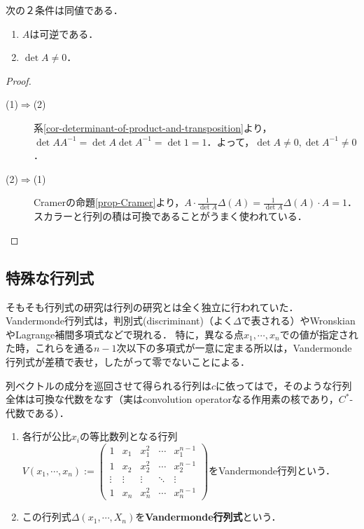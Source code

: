 \documentclass[uplatex, dvipdfmx]{jsreport}
\begin{document}
\begin{corollary}\label{cor-characterization-of-invertibility}
    次の２条件は同値である．
    \begin{enumerate}
        \item $A$は可逆である．
        \item $\det A\ne 0$．
    \end{enumerate}
\end{corollary}
\begin{proof}\mbox{}
    \begin{description}
        \item[(1)$\Rightarrow$(2)] 系\ref{cor-determinant-of-product-and-transposition}より，$\det AA^{-1}=\det A\det A^{-1}=\det 1=1$．よって，$\det A\ne 0,\det A^{-1}\ne 0$．
        \item[(2)$\Rightarrow$(1)] Cramerの命題\ref{prop-Cramer}より，$A\cdot\frac{1}{\det A}\Delta(A)=\frac{1}{\det A}\Delta(A)\cdot A=1$．スカラーと行列の積は可換であることがうまく使われている．
    \end{description}
\end{proof}

\subsection{特殊な行列式}

\begin{tcolorbox}[colframe=ForestGreen, colback=ForestGreen!10!white,breakable,colbacktitle=ForestGreen!40!white,coltitle=black,fonttitle=\bfseries\sffamily,
title=]
    そもそも行列式の研究は行列の研究とは全く独立に行われていた．
    Vandermonde行列式は，判別式(discriminant)（よく$\Delta$で表される）やWronskianやLagrange補間多項式などで現れる．
    特に，異なる点$x_1,\cdots,x_n$での値が指定された時，これらを通る$n-1$次以下の多項式が一意に定まる所以は，Vandermonde行列式が差積で表せ，したがって零でないことによる．
    
    列ベクトルの成分を巡回させて得られる行列は$c$に依ってはで，そのような行列全体は可換な代数をなす（実はconvolution operatorなる作用素の核であり，$C^*$-代数である）．
\end{tcolorbox}

\begin{definition}\mbox{}
    \begin{enumerate}
        \item 各行が公比$x_i$の等比数列となる行列$V(x_1,\cdots,x_n):=\begin{pmatrix}1&x_1&x_1^2&\cdots&x_1^{n-1}\\1&x_2&x_2^2&\cdots&x_2^{n-1}\\\vdots&\vdots&\vdots&\ddots&\vdots\\1&x_n&x_n^2&\cdots&x_n^{n-1}\end{pmatrix}$をVandermonde行列という．
        \item この行列式$\Delta(x_1,\cdots,X_n)$を\textbf{Vandermonde行列式}という．
    \end{enumerate}
\end{definition}
\end{document}
